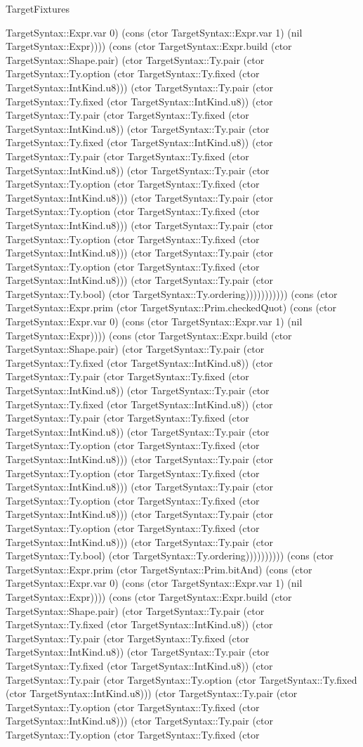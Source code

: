 \begin{lexlean}{TargetFixtures}
\begin{semanticmodule}
{TargetSyntax::Expr.var 0) (cons (ctor TargetSyntax::Expr.var 1) (nil TargetSyntax::Expr)))) (cons (ctor TargetSyntax::Expr.build (ctor TargetSyntax::Shape.pair) (ctor TargetSyntax::Ty.pair (ctor TargetSyntax::Ty.option (ctor TargetSyntax::Ty.fixed (ctor TargetSyntax::IntKind.u8))) (ctor TargetSyntax::Ty.pair (ctor TargetSyntax::Ty.fixed (ctor TargetSyntax::IntKind.u8)) (ctor TargetSyntax::Ty.pair (ctor TargetSyntax::Ty.fixed (ctor TargetSyntax::IntKind.u8)) (ctor TargetSyntax::Ty.pair (ctor TargetSyntax::Ty.fixed (ctor TargetSyntax::IntKind.u8)) (ctor TargetSyntax::Ty.pair (ctor TargetSyntax::Ty.fixed (ctor TargetSyntax::IntKind.u8)) (ctor TargetSyntax::Ty.pair (ctor TargetSyntax::Ty.option (ctor TargetSyntax::Ty.fixed (ctor TargetSyntax::IntKind.u8))) (ctor TargetSyntax::Ty.pair (ctor TargetSyntax::Ty.option (ctor TargetSyntax::Ty.fixed (ctor TargetSyntax::IntKind.u8))) (ctor TargetSyntax::Ty.pair (ctor TargetSyntax::Ty.option (ctor TargetSyntax::Ty.fixed (ctor TargetSyntax::IntKind.u8))) (ctor TargetSyntax::Ty.pair (ctor TargetSyntax::Ty.option (ctor TargetSyntax::Ty.fixed (ctor TargetSyntax::IntKind.u8))) (ctor TargetSyntax::Ty.pair (ctor TargetSyntax::Ty.bool) (ctor TargetSyntax::Ty.ordering))))))))))) (cons (ctor TargetSyntax::Expr.prim (ctor TargetSyntax::Prim.checkedQuot) (cons (ctor TargetSyntax::Expr.var 0) (cons (ctor TargetSyntax::Expr.var 1) (nil TargetSyntax::Expr)))) (cons (ctor TargetSyntax::Expr.build (ctor TargetSyntax::Shape.pair) (ctor TargetSyntax::Ty.pair (ctor TargetSyntax::Ty.fixed (ctor TargetSyntax::IntKind.u8)) (ctor TargetSyntax::Ty.pair (ctor TargetSyntax::Ty.fixed (ctor TargetSyntax::IntKind.u8)) (ctor TargetSyntax::Ty.pair (ctor TargetSyntax::Ty.fixed (ctor TargetSyntax::IntKind.u8)) (ctor TargetSyntax::Ty.pair (ctor TargetSyntax::Ty.fixed (ctor TargetSyntax::IntKind.u8)) (ctor TargetSyntax::Ty.pair (ctor TargetSyntax::Ty.option (ctor TargetSyntax::Ty.fixed (ctor TargetSyntax::IntKind.u8))) (ctor TargetSyntax::Ty.pair (ctor TargetSyntax::Ty.option (ctor TargetSyntax::Ty.fixed (ctor TargetSyntax::IntKind.u8))) (ctor TargetSyntax::Ty.pair (ctor TargetSyntax::Ty.option (ctor TargetSyntax::Ty.fixed (ctor TargetSyntax::IntKind.u8))) (ctor TargetSyntax::Ty.pair (ctor TargetSyntax::Ty.option (ctor TargetSyntax::Ty.fixed (ctor TargetSyntax::IntKind.u8))) (ctor TargetSyntax::Ty.pair (ctor TargetSyntax::Ty.bool) (ctor TargetSyntax::Ty.ordering)))))))))) (cons (ctor TargetSyntax::Expr.prim (ctor TargetSyntax::Prim.bitAnd) (cons (ctor TargetSyntax::Expr.var 0) (cons (ctor TargetSyntax::Expr.var 1) (nil TargetSyntax::Expr)))) (cons (ctor TargetSyntax::Expr.build (ctor TargetSyntax::Shape.pair) (ctor TargetSyntax::Ty.pair (ctor TargetSyntax::Ty.fixed (ctor TargetSyntax::IntKind.u8)) (ctor TargetSyntax::Ty.pair (ctor TargetSyntax::Ty.fixed (ctor TargetSyntax::IntKind.u8)) (ctor TargetSyntax::Ty.pair (ctor TargetSyntax::Ty.fixed (ctor TargetSyntax::IntKind.u8)) (ctor TargetSyntax::Ty.pair (ctor TargetSyntax::Ty.option (ctor TargetSyntax::Ty.fixed (ctor TargetSyntax::IntKind.u8))) (ctor TargetSyntax::Ty.pair (ctor TargetSyntax::Ty.option (ctor TargetSyntax::Ty.fixed (ctor TargetSyntax::IntKind.u8))) (ctor TargetSyntax::Ty.pair (ctor TargetSyntax::Ty.option (ctor TargetSyntax::Ty.fixed (ctor }
\end{semanticmodule}
\end{lexlean}
